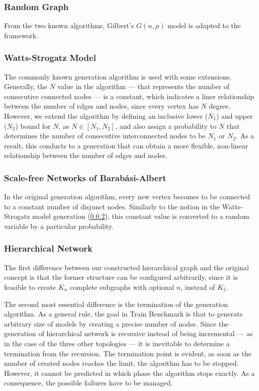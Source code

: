\subsubsection{Random Graph}
From the two known algorithms, Gilbert's $G(n,p)$ model is adapted to the framework.

\subsubsection{Watts-Strogatz Model}\label{sec:watts_generation}

The commonly known generation algorithm is used with some extensions. Generally, the $N$ value in the algorithm --- that represents the number of consecutive connected nodes --- is a constant, which indicates a liner relationship between the number of edges and nodes, since every vertex has $N$ degree. However, we extend the algorithm by defining an inclusive lower ($N_1$) and upper ($N_2$) bound for $N$, as $N\in[N_1, N_2]$, and also assign a probability to $N$ that determines the number of consecutive interconnected nodes to be $N_1$ or $N_2$. As a result, this conducts to a generation that can obtain a more flexible, non-linear relationship between the number of edges and nodes.

\subsubsection{Scale-free Networks of Barabási-Albert}

In the original generation algorithm, every new vertex becomes to be connected to a constant number of disjunct nodes. Similarly to the notion in the Watts-Strogatz model generation (\ref{sec:watts_generation}), this constant value is converted to a random variable by a particular probability.

\subsubsection{Hierarchical Network}\label{sec:hierarcical_contribution}

The first difference between our constructed hierarchical graph and the original concept is that the former structure can be configured arbitrarily, since it is feasible to create $K_n$ complete subgraphs with optional $n$, instead of $K_5$. %

The second most essential difference is the termination of the generation algorithm. As a general rule, the goal in Train Benchmark is that to generate arbitrary size of models by creating a precise number of nodes. Since the generation of hierarchical network is recursive instead of being incremental --- as in the case of the three other topologies --- it is inevitable to determine a termination from the recursion. The termination point is evident, as soon as the number of created nodes reaches the limit, the algorithm has to be stopped. However, it cannot be predicted in which phase the algorithm stops exactly. As a consequence, the possible failures have to be managed.


